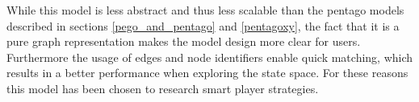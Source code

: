 \vspace{6pt}

While this model is less abstract and thus less scalable than the pentago models described in sections \ref{pego_and_pentago} and \ref{pentagoxy}, the fact that it is a pure graph representation makes the model design more clear for users.
Furthermore the usage of edges and node identifiers enable quick matching, which results in a better performance when exploring the state space.
For these reasons this model has been chosen to research smart player strategies.